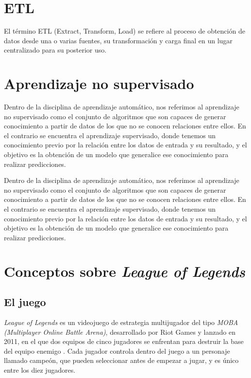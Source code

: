 
\section{ETL}
El término ETL (Extract, Transform, Load) se refiere al proceso de obtención de datos desde una o varias fuentes, su transformación y carga final en un lugar centralizado para su posterior uso.

\section{Aprendizaje no supervisado}
Dentro de la disciplina de aprendizaje automático, nos referimos al aprendizaje no supervisado como el conjunto de algoritmos que son capaces de generar conocimiento a partir de datos de los que no se conocen relaciones entre ellos. En el contrario se encuentra el aprendizaje supervisado, donde tenemos un conocimiento previo por la relación entre los datos de entrada y su resultado, y el objetivo es la obtención de un modelo que generalice ese conocimiento para realizar predicciones.

Dentro de la disciplina de aprendizaje automático, nos referimos al aprendizaje no supervisado como el conjunto de algoritmos que son capaces de generar conocimiento a partir de datos de los que no se conocen relaciones entre ellos. En el contrario se encuentra el aprendizaje supervisado, donde tenemos un conocimiento previo por la relación entre los datos de entrada y su resultado, y el objetivo es la obtención de un modelo que generalice ese conocimiento para realizar predicciones.

\section{Conceptos sobre \textit{League of Legends}}

\subsection{El juego}
\textit{League of Legends} es un videojuego de estrategia multijugador del tipo \textit{MOBA (Multiplayer Online Battle Arena)}, desarrollado por Riot Games y lanzado en 2011, en el que dos equipos de cinco jugadores se enfrentan para destruir la base del equipo enemigo \cite{misc:como-jugar}. Cada jugador controla dentro del juego a un personaje llamado campeón, que pueden seleccionar antes de empezar a jugar, y es único entre los diez jugadores.

